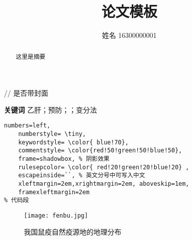 \documentclass[UTF8,a4paper,12pt]{ctexart}%
\title{论文模板}
\author{姓名 16300000001}
\date{}
\begin{document}
	   // 是否带封面

\begin{abstract}
	这里是摘要
\end{abstract}
\noindent{}\textbf{关键词}\quad{} 乙肝；预防；；变分法

\tableofcontents %
\listoffigures%
\setcounter{page}{0}
\thispagestyle{empty}
\begin{lstlisting}[title=Myfile, frame=shadowbox]
 numbers=left, 
    numberstyle= \tiny, 
    keywordstyle= \color{ blue!70},
    commentstyle= \color{red!50!green!50!blue!50}, 
    frame=shadowbox, % 阴影效果
    rulesepcolor= \color{ red!20!green!20!blue!20} ,
    escapeinside=``, % 英文分号中可写入中文
    xleftmargin=2em,xrightmargin=2em, aboveskip=1em,
    framexleftmargin=2em
% 代码段
\end{lstlisting}

\begin{figure}[htb]
	\centering
	\texttt{[image: fenbu.jpg]}
		\caption{我国鼠疫自然疫源地的地理分布}
\label{fig:fenbu}
\end{figure}
  
\end{document}
